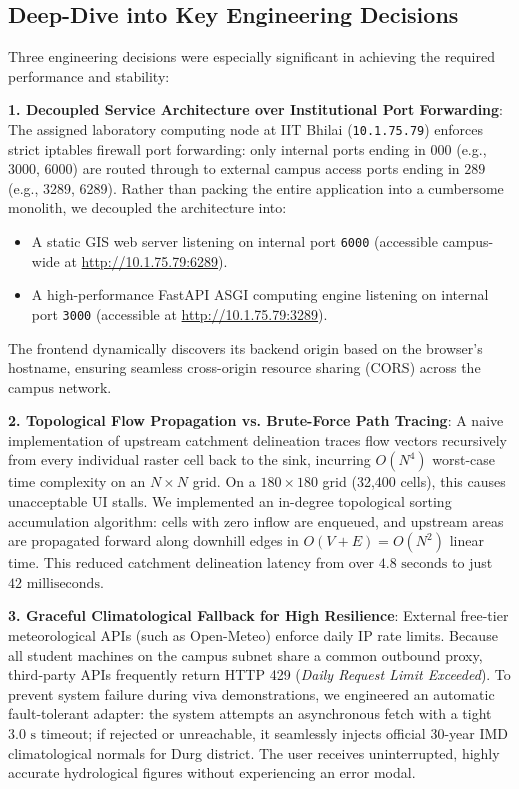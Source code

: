 \documentclass[manuscript,screen,nonacm]{acmart}
\begin{document}
\subsection{Deep-Dive into Key Engineering Decisions}
Three engineering decisions were especially significant in achieving the required performance and stability:

\noindent \textbf{1. Decoupled Service Architecture over Institutional Port Forwarding}:
The assigned laboratory computing node at IIT Bhilai (\texttt{10.1.75.79}) enforces strict iptables firewall port forwarding: only internal ports ending in $000$ (e.g., 3000, 6000) are routed through to external campus access ports ending in $289$ (e.g., 3289, 6289). Rather than packing the entire application into a cumbersome monolith, we decoupled the architecture into:
\begin{itemize}
    \item A static GIS web server listening on internal port \texttt{6000} (accessible campus-wide at \url{http://10.1.75.79:6289}).
    \item A high-performance FastAPI ASGI computing engine listening on internal port \texttt{3000} (accessible at \url{http://10.1.75.79:3289}).
\end{itemize}
The frontend dynamically discovers its backend origin based on the browser's hostname, ensuring seamless cross-origin resource sharing (CORS) across the campus network.

\noindent \textbf{2. Topological Flow Propagation vs. Brute-Force Path Tracing}:
A naive implementation of upstream catchment delineation traces flow vectors recursively from every individual raster cell back to the sink, incurring $O(N^4)$ worst-case time complexity on an $N \times N$ grid. On a $180 \times 180$ grid (32,400 cells), this causes unacceptable UI stalls. We implemented an in-degree topological sorting accumulation algorithm: cells with zero inflow are enqueued, and upstream areas are propagated forward along downhill edges in $O(V + E) = O(N^2)$ linear time. This reduced catchment delineation latency from over $4.8\text{ seconds}$ to just $42\text{ milliseconds}$.

\noindent \textbf{3. Graceful Climatological Fallback for High Resilience}:
External free-tier meteorological APIs (such as Open-Meteo) enforce daily IP rate limits. Because all student machines on the campus subnet share a common outbound proxy, third-party APIs frequently return HTTP 429 (\textit{Daily Request Limit Exceeded}). To prevent system failure during viva demonstrations, we engineered an automatic fault-tolerant adapter: the system attempts an asynchronous fetch with a tight $3.0\text{ s}$ timeout; if rejected or unreachable, it seamlessly injects official 30-year IMD climatological normals for Durg district. The user receives uninterrupted, highly accurate hydrological figures without experiencing an error modal.
\end{document}
